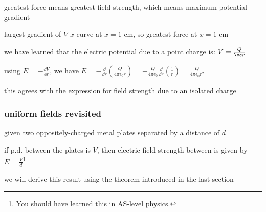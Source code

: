 \sol greatest force means greatest field strength, which means maximum potential gradient 

largest gradient of $V$-$x$ curve at $x=1$ cm, so greatest force at $x=1$ cm \eoe


we have learned that the electric potential due to a point charge is: $V = \frac{Q}{\ec r}$
	
using $E = -\frac{\dd V}{\dd r}$, we have $E = -\frac{\dd}{\dd r}\left( \frac{Q}{4\pi\epsilon_0r} \right) = -\frac{Q}{4\pi\epsilon_0}\frac{\dd}{\dd r}\left(\frac{1}{r}\right) = \frac{Q}{4\pi\epsilon_0r^2}$

this agrees with the expression for field strength due to an isolated charge \eoe






\subsubsection*{uniform fields revisited}

given two oppositely-charged metal plates separated by a distance of $d$

if p.d. between the plates is $V$, then electric field strength between is given by $E = \frac{V}{d}$\footnote{You should have learned this in AS-level physics.}

we will derive this result using the theorem introduced in the last section

